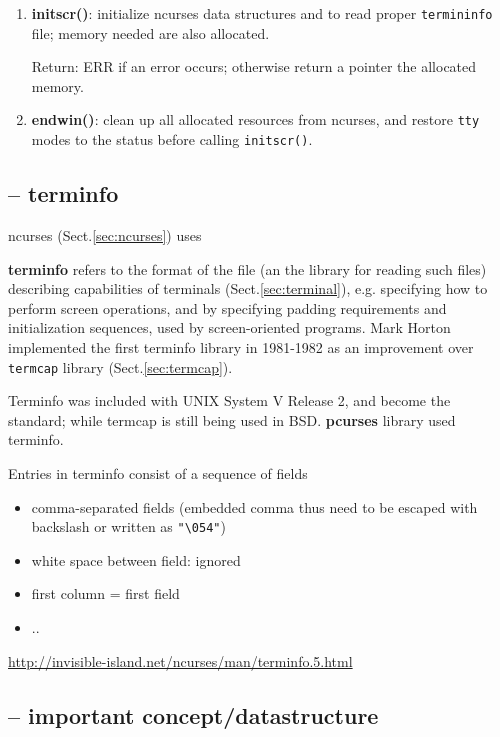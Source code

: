 \begin{enumerate}
  \item {\bf initscr()}: initialize ncurses data structures and to read proper
  \verb!termininfo! file; memory needed are also allocated.

Return: ERR if an error occurs; otherwise return a pointer the allocated memory.
  
  \item {\bf endwin()}: clean up all allocated resources from ncurses, and
  restore \verb!tty! modes to the status before calling \verb!initscr()!.
\end{enumerate}


\subsection{-- terminfo}
\label{sec:terminfo}
\label{sec:terminfo-library}

ncurses (Sect.\ref{sec:ncurses}) uses


{\bf terminfo} refers to the format of the file (an the library for reading such
files) describing capabilities of terminals (Sect.\ref{sec:terminal}), e.g.
specifying how to perform screen operations, and by specifying padding
requirements and initialization sequences, used by screen-oriented programs.
Mark Horton implemented the first terminfo library in 1981-1982 as an
improvement over \verb!termcap! library (Sect.\ref{sec:termcap}).

Terminfo was included with UNIX System V Release 2, and become the standard;
while termcap is still being used in BSD. {\bf pcurses} library used terminfo.

Entries in terminfo consist of a sequence of fields
\begin{itemize}
  \item comma-separated fields (embedded comma thus need to be escaped with
  backslash or written as \verb!"\054"!)
  
  \item white space between field: ignored
  
  \item first column = first field
  \item ..
\end{itemize}
\url{http://invisible-island.net/ncurses/man/terminfo.5.html}

\subsection{-- important concept/datastructure}


